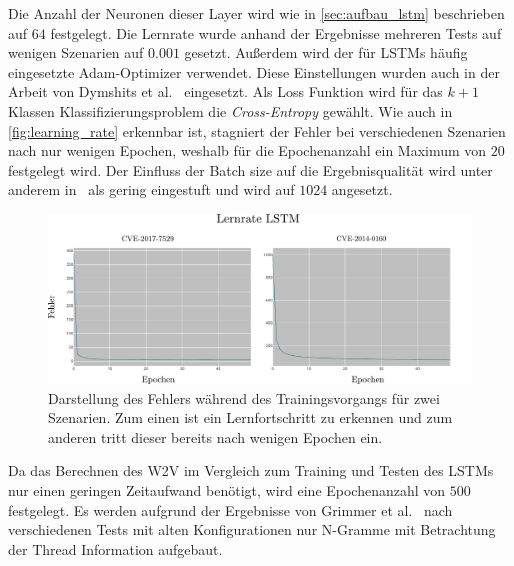                 Die Anzahl der Neuronen dieser Layer wird wie in \autoref{sec:aufbau_lstm} beschrieben auf $64$ festgelegt.
                Die Lernrate wurde anhand der Ergebnisse mehreren Tests auf wenigen Szenarien auf $0.001$ gesetzt.
                Außerdem wird der für \acp{LSTM} häufig eingesetzte Adam-Optimizer verwendet.
                Diese Einstellungen wurden auch in der Arbeit von Dymshits et al.~\cite{LSTMDYMSHITS2017} eingesetzt.
                Als Loss Funktion wird für das $k+1$ Klassen Klassifizierungsproblem die \textit{Cross-Entropy} gewählt.
                Wie auch in \autoref{fig:learning_rate} erkennbar ist, stagniert der Fehler bei verschiedenen Szenarien nach nur wenigen Epochen, weshalb für die Epochenanzahl ein Maximum von $20$ festgelegt wird.
                Der Einfluss der Batch size auf die Ergebnisqualität wird unter anderem in~\cite{LSTMBENCHBREUEL2015} als gering eingestuft und wird auf $1024$ angesetzt.
                 
                
                \begin{figure}
                    \centering
                    \includegraphics[width=\textwidth]{images/learning_rate.pdf}
                    \caption[Parameterwahl - Fehler während des Trainings]{Darstellung des Fehlers während des Trainingsvorgangs für zwei Szenarien.
                             Zum einen ist ein Lernfortschritt zu erkennen und zum anderen tritt dieser bereits nach wenigen Epochen ein.}\label{fig:learning_rate}
                \end{figure}

                Da das Berechnen des \ac{W2V} im Vergleich zum Training und Testen des \acp{LSTM} nur einen geringen Zeitaufwand benötigt, wird eine Epochenanzahl von $500$ festgelegt. 
                Es werden aufgrund der Ergebnisse von Grimmer et al.~\cite{IDSTHREADGRIMMER2021} nach verschiedenen Tests mit alten Konfigurationen nur N-Gramme mit Betrachtung der Thread Information aufgebaut.

